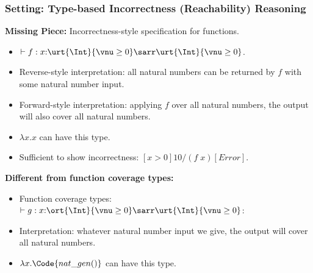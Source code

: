 \begin{frame}[fragile]
    \frametitle{Setting: Type-based Incorrectness (Reachability) Reasoning}

\textbf{Missing Piece:} Incorrectness-style specification for functions.
\begin{itemize}
    \item $\vdash f : x{:}\urt{\Int}{\vnu \geq 0} \sarr \urt{\Int}{\vnu \geq 0}$.
    \item Reverse-style interpretation: all natural numbers can be returned by $f$ with some natural number input.
    \item Forward-style interpretation: applying $f$ over all natural numbers, the output will also cover all natural numbers.
    \item $\lambda x. x$ can have this type.
    \item Sufficient to show incorrectness: $[x > 0]10 / (f\;x) [Error]$.
\end{itemize}

\textbf{Different from function coverage types:}
\begin{itemize}
    \item Function coverage types: $\vdash g : x{:}\ort{\Int}{\vnu \geq 0} \sarr \urt{\Int}{\vnu \geq 0}$:
    \item Interpretation: whatever natural number input we give, the output will cover all natural numbers.
    \item $\lambda x. \Code{nat\_gen()}$ can have this type.
\end{itemize}

\end{frame}

